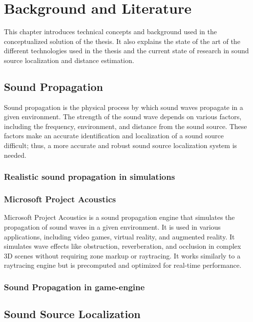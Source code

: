 \chapter{Background and Literature}
\label{ch:background}

This chapter introduces technical concepts and background used in the conceptualized solution of the thesis. It also explains the state of the art of the different technologies used in the thesis and the current state of research in sound source localization and distance estimation.

\section{Sound Propagation}

Sound propagation is the physical process by which sound waves propagate in a given environment. The strength of the sound wave depends on various factors, including the frequency, environment, and distance from the sound source. These factors make an accurate identification and localization of a sound source difficult; thus, a more accurate and robust sound source localization system is needed.

\subsection{Realistic sound propagation in simulations}

\subsection{Microsoft Project Acoustics}

Microsoft Project Acoustics is a sound propagation engine that simulates the propagation of sound waves in a given environment. It is used in various applications, including video games, virtual reality, and augmented reality. It simulates wave effects like obstruction, reverberation, and occlusion in complex 3D scenes without requiring zone markup or raytracing. It works similarly to a raytracing engine but is precomputed and optimized for real-time performance. 

\subsection{Sound Propagation in game-engine}

\section{Sound Source Localization}

